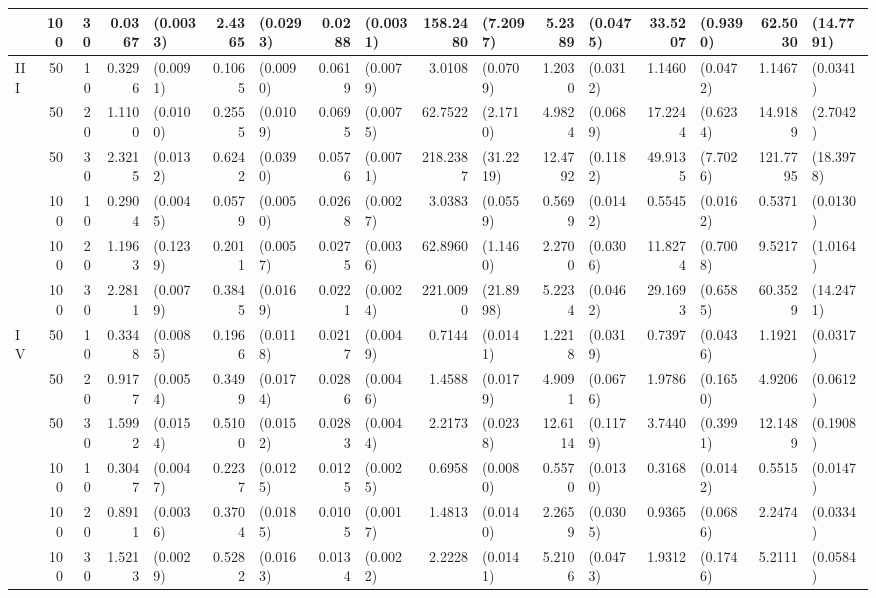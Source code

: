\begin{landscape}
\begin{table}[H]
\begin{scriptsize}
\begin{tabular}{lrrrlrlrlrlrlrlrl}
    & 100 & 30 & 0.0367 & (0.0033) & 2.4365 & (0.0293) & 0.0288 & (0.0031) & 158.2480 & (7.2097) & 5.2389 & (0.0475) & 33.5207 & (0.9390) & 62.5030 & (14.7791) \\ 
   \hline
III & 50 & 10 & 0.3296 & (0.0091) & 0.1065 & (0.0090) & 0.0619 & (0.0079) & 3.0108 & (0.0709) & 1.2030 & (0.0312) & 1.1460 & (0.0472) & 1.1467 & (0.0341) \\ 
    & 50 & 20 & 1.1100 & (0.0100) & 0.2555 & (0.0109) & 0.0695 & (0.0075) & 62.7522 & (2.1710) & 4.9824 & (0.0689) & 17.2244 & (0.6234) & 14.9189 & (2.7042) \\ 
    & 50 & 30 & 2.3215 & (0.0132) & 0.6242 & (0.0390) & 0.0576 & (0.0071) & 218.2387 & (31.2219) & 12.4792 & (0.1182) & 49.9135 & (7.7026) & 121.7795 & (18.3978) \\ 
    & 100 & 10 & 0.2904 & (0.0045) & 0.0579 & (0.0050) & 0.0268 & (0.0027) & 3.0383 & (0.0559) & 0.5699 & (0.0142) & 0.5545 & (0.0162) & 0.5371 & (0.0130) \\ 
    & 100 & 20 & 1.1963 & (0.1239) & 0.2011 & (0.0057) & 0.0275 & (0.0036) & 62.8960 & (1.1460) & 2.2700 & (0.0306) & 11.8274 & (0.7008) & 9.5217 & (1.0164) \\ 
    & 100 & 30 & 2.2811 & (0.0079) & 0.3845 & (0.0169) & 0.0221 & (0.0024) & 221.0090 & (21.8998) & 5.2234 & (0.0462) & 29.1693 & (0.6585) & 60.3529 & (14.2471) \\ 
   \hline
IV & 50 & 10 & 0.3348 & (0.0085) & 0.1966 & (0.0118) & 0.0217 & (0.0049) & 0.7144 & (0.0141) & 1.2218 & (0.0319) & 0.7397 & (0.0436) & 1.1921 & (0.0317) \\ 
    & 50 & 20 & 0.9177 & (0.0054) & 0.3499 & (0.0174) & 0.0286 & (0.0046) & 1.4588 & (0.0179) & 4.9091 & (0.0676) & 1.9786 & (0.1650) & 4.9206 & (0.0612) \\ 
    & 50 & 30 & 1.5992 & (0.0154) & 0.5100 & (0.0152) & 0.0283 & (0.0044) & 2.2173 & (0.0238) & 12.6114 & (0.1179) & 3.7440 & (0.3991) & 12.1489 & (0.1908) \\ 
    & 100 & 10 & 0.3047 & (0.0047) & 0.2237 & (0.0125) & 0.0125 & (0.0025) & 0.6958 & (0.0080) & 0.5570 & (0.0130) & 0.3168 & (0.0142) & 0.5515 & (0.0147) \\ 
    & 100 & 20 & 0.8911 & (0.0036) & 0.3704 & (0.0185) & 0.0105 & (0.0017) & 1.4813 & (0.0140) & 2.2659 & (0.0305) & 0.9365 & (0.0686) & 2.2474 & (0.0334) \\ 
    & 100 & 30 & 1.5213 & (0.0029) & 0.5282 & (0.0163) & 0.0134 & (0.0022) & 2.2228 & (0.0141) & 5.2106 & (0.0473) & 1.9312 & (0.1746) & 5.2111 & (0.0584) \\ 

\end{tabular}
\end{scriptsize}
\end{table}
\end{landscape}
